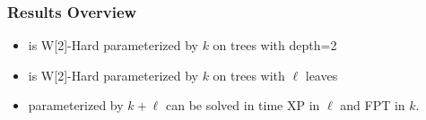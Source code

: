 \begin{frame}[t]
    \frametitle{Results Overview}
    \begin{itemize}
        \item \gm is W[2]-Hard parameterized by $k$ on trees with depth=2
        \item \gm is W[2]-Hard parameterized by $k$ on trees with $\ell$ leaves
        \item \gm parameterized by $k+\ell$ can be solved in time XP in $\ell$ and FPT in $k$.
    \end{itemize}
    \vspace{1.0cm}
\end{frame}
